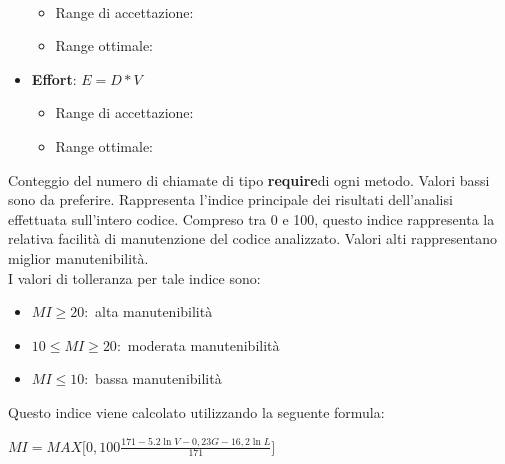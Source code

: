 \documentclass[a4paper,11pt]{article}
\begin{document}
\begin{itemize}
\begin{math}
\end{math}
\begin{itemize}
	\item Range di accettazione: \begin{math}[0 - 30]\end{math}
	\item Range ottimale: \begin{math}[0 - 15]\end{math}
	\end{itemize}
\item \textbf{Effort}: 
\begin{math}
E = D * V
\end{math}
\begin{itemize}
	\item Range di accettazione: \begin{math}[0 - 400]\end{math}
	\item Range ottimale: \begin{math}[0 - 300]\end{math}
	\end{itemize}
\end{itemize} 
Conteggio del numero di chiamate di tipo \textbf{require}\addglos di ogni metodo. Valori bassi sono da preferire.
 Rappresenta l'indice principale dei risultati dell'analisi effettuata sull'intero codice. Compreso tra 0 e 100, questo indice rappresenta la relativa facilità di manutenzione del codice analizzato. Valori alti rappresentano miglior manutenibilità.\\
I valori di tolleranza per tale indice sono:
\begin{itemize}
\item  \begin{math} MI \ge 20: \end{math} alta manutenibilità
\item \begin{math}10 \leq MI \geq 20: \end{math} moderata manutenibilità
\item \begin{math}MI \leq 10: \end{math} bassa manutenibilità
\end{itemize}
Questo indice viene calcolato utilizzando la seguente formula: \\
\begin{center}
\begin{math}
MI = MAX\bigg[ 0,100 \frac{171-5.2\ln V - 0,23G - 16,2\ln L}{171} \bigg]
\end{math}
\end{center}
\end{document}
